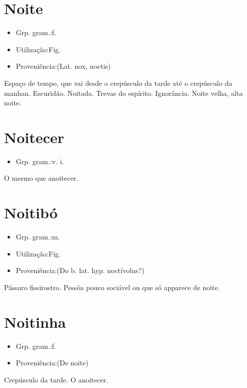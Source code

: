 \section{Noite}
\begin{itemize}
\item {Grp. gram.:f.}
\end{itemize}
\begin{itemize}
\item {Utilização:Fig.}
\end{itemize}
\begin{itemize}
\item {Proveniência:(Lat. \textunderscore nox\textunderscore , \textunderscore noctis\textunderscore )}
\end{itemize}
Espaço de tempo, que vai desde o crepúsculo da tarde até o crepúsculo da manhan.
Escuridão.
Noitada.
Trevas do espírito.
Ignorância.
\textunderscore Noite velha\textunderscore , alta noite.
\section{Noitecer}
\begin{itemize}
\item {Grp. gram.:v. i.}
\end{itemize}
O mesmo que \textunderscore anoitecer\textunderscore .
\section{Noitibó}
\begin{itemize}
\item {Grp. gram.:m.}
\end{itemize}
\begin{itemize}
\item {Utilização:Fig.}
\end{itemize}
\begin{itemize}
\item {Proveniência:(Do b. lat. hyp. \textunderscore noctívolus?\textunderscore )}
\end{itemize}
Pássaro fissirostro.
Pessôa pouco sociável ou que só apparece de noite.
\section{Noitinha}
\begin{itemize}
\item {Grp. gram.:f.}
\end{itemize}
\begin{itemize}
\item {Proveniência:(De \textunderscore noite\textunderscore )}
\end{itemize}
Crepúsculo da tarde.
O anoitecer.
